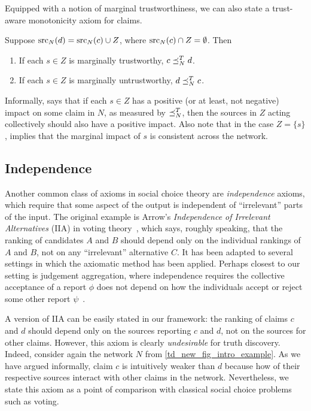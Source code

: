 Equipped with a notion of marginal trustworthiness, we can also state a
trust-aware monotonicity axiom for claims.

\begin{axiom}[\trustbasedmon{}]
    Suppose $\operatorname{src}_N(d) = \operatorname{src}_N(c) \cup Z$, where $\operatorname{src}_N(c) \cap Z =
    \emptyset$. Then
    \begin{enumerate}
        \item If each $s \in Z$ is marginally trustworthy, $c \preceq_N^T d$.
        \item If each $s \in Z$ is marginally untrustworthy, $d \preceq_N^T c$.
    \end{enumerate}
\end{axiom}

Informally, \trustbasedmon{} says that if each $s \in Z$ has a positive (or at
least, not negative) impact on some claim in $N$, as measured by $\preceq_N^T$,
then the sources in $Z$ acting collectively should also have a positive impact.
Also note that in the case $Z = \{s\}$, \trustbasedmon{} implies that the
marginal impact of $s$ is consistent across the network.

\subsection{Independence}
\label{td_new_sec_independence}

Another common class of axioms in social choice theory are \emph{independence}
axioms, which require that some aspect of the output is independent of
``irrelevant'' parts of the input. The original example is Arrow's
\emph{Independence of Irrelevant Alternatives} (IIA) in voting
theory~\cite{arrow1952}, which says, roughly speaking, that the ranking of
candidates $A$ and $B$ should depend only on the individual rankings of $A$ and
$B$, not on any ``irrelevant'' alternative $C$. It has been adapted to several
settings in which the axiomatic method has been applied. Perhaps closest to our
setting is judgement aggregation, where independence requires the collective
acceptance of a report $\phi$ does not depend on how the individuals accept or
reject some other report $\psi$~\cite{endriss2016ja}.

A version of IIA can be easily stated in our framework: the ranking of claims
$c$ and $d$ should depend only on the sources reporting $c$ and $d$, not on the
sources for other claims. However, this axiom is clearly \emph{undesirable} for
truth discovery. Indeed, consider again the network $N$ from
\cref{td_new_fig_intro_example}. As we have argued informally, claim $c$ is
intuitively weaker than $d$ because how of their respective sources interact
with other claims in the network. Nevertheless, we state this axiom as a point
of comparison with classical social choice problems such as voting.


